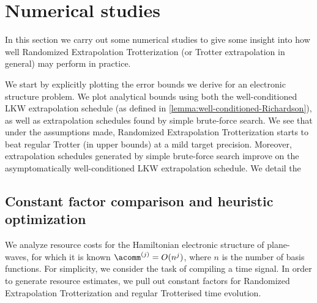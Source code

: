 \section{Numerical studies}
\label{sec:numerical-comparison}

In this section we carry out some numerical studies to give some insight into how well Randomized Extrapolation Trotterization (or Trotter extrapolation in general) may perform in practice.

We start by explicitly plotting the error bounds we derive for an electronic structure problem. We plot analytical bounds using both the well-conditioned LKW extrapolation schedule (as defined in \cref{lemma:well-conditioned-Richardson}), as well as extrapolation schedules found by simple brute-force search. We see that under the assumptions made, Randomized Extrapolation Trotterization starts to beat regular Trotter (in upper bounds) at a mild target precision. Moreover, extrapolation schedules generated by simple brute-force search improve on the asymptomatically well-conditioned LKW extrapolation schedule. We detail the

\subsection{Constant factor comparison and heuristic optimization}\label{sec:trotter-constants}

We analyze resource costs for the Hamiltonian electronic structure of plane-waves, for which it is known $\acomm^{(j)} = O(n^j)$, where $n$ is the number of basis functions. For simplicity, we consider the task of compiling a time signal. In order to generate resource estimates, we pull out constant factors for Randomized Extrapolation Trotterization and regular Trotterised time evolution.

\medskip

